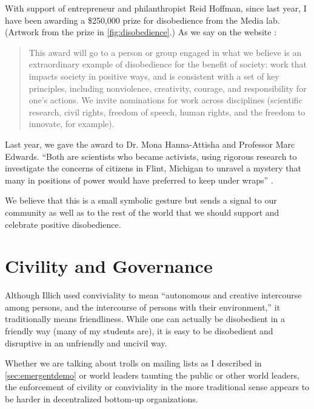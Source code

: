 With support of entrepreneur and philanthropist Reid Hoffman, since last year, I have been awarding a \$250,000 prize for disobedience from the Media lab. (Artwork from the prize in \autoref{fig:disobedience}.) As we say on the website \cite{disobedience2018}:

\begin{quote}
This award will go to a person or group engaged in what we believe is an extraordinary example of disobedience for the benefit of society: work that impacts society in positive ways, and is consistent with a set of key principles, including nonviolence, creativity, courage, and responsibility for one’s actions. We invite nominations for work across disciplines (scientific research, civil rights, freedom of speech, human rights, and the freedom to innovate, for example). 
\end{quote}

Last year, we gave the award to Dr. Mona Hanna-Attisha and Professor Marc Edwards. ``Both are scientists who became activists, using rigorous research to investigate the concerns of citizens in Flint, Michigan to unravel a mystery that many in positions of power would have preferred to keep under wraps'' \cite{disobedience2017}.

We believe that this is a small symbolic gesture but sends a signal to our community as well as to the rest of the world that we should support and celebrate positive disobedience.

\section{Civility and Governance}

Although Illich used conviviality to mean ``autonomous and creative intercourse among persons, and the intercourse of persons with their environment,'' it traditionally means friendliness. While one can actually be disobedient in a friendly way (many of my students are), it is easy to be disobedient and disruptive in an unfriendly and uncivil way.

Whether we are talking about trolls on mailing lists as I described in \autoref{sec:emergentdemo} or world leaders taunting the public or other world leaders, the enforcement of civility or conviviality in the more traditional sense appears to be harder in decentralized bottom-up organizations.

